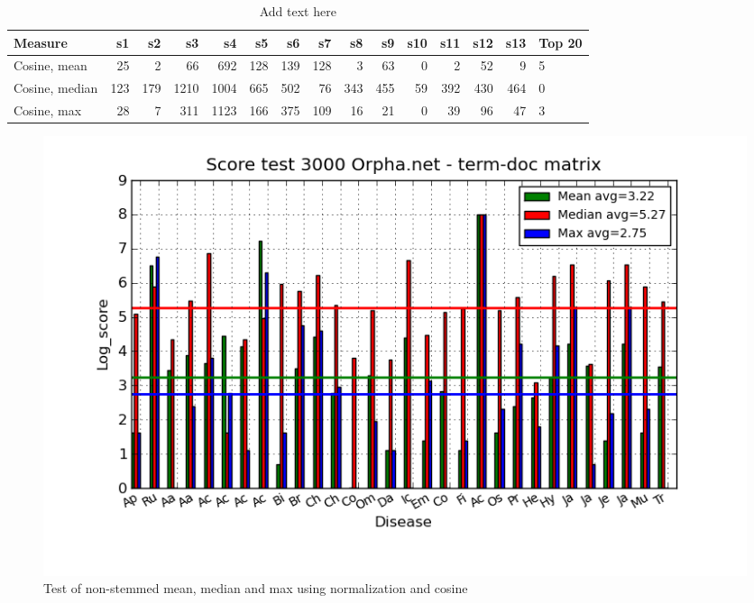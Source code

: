 \begin{center}
\begin{table}
  \begin{tiny}
  \caption{Add text here}
  \label{testResult}
  \begin{tabular}{|l|r|r|r|r|r|r|r|r|r|r|r|r|r|l|}
    \hline
    Measure & s1 & s2 & s3 & s4 & s5 & s6 & s7 & s8 & s9 & s10 & s11 & s12 & s13 & Top 20 \\
    \hline
    Cosine, mean & 25 & 2 & 66 & 692 & 128 & 139 & 128 & 3 & 63 & 0 & 2 & 52 & 9 & 5 \\
    \hline
    Cosine, median & 123 & 179 & 1210 & 1004 & 665 & 502 & 76 & 343 & 455 & 59 & 392 & 430 & 464 & 0\\
    \hline
    Cosine, max & 28 & 7 & 311 & 1123 & 166 & 375 & 109 & 16 & 21 & 0 & 39 & 96 & 47 & 3 \\
    \hline
  \end{tabular}
  \end{tiny}
\end{table}
\end{center}
\begin{figure}[h!]
        \begin{center}
          \includegraphics[width=1.0\textwidth]{barcharts/termDoc_orphan_hist_3000_ns_mea_med_max_nc.png}
        \end{center}
        \caption{Test of non-stemmed mean, median and max using normalization and cosine}
        \label{termDoc_orphan_hist_3000_ns_mea_med_max_nc}
\end{figure}

